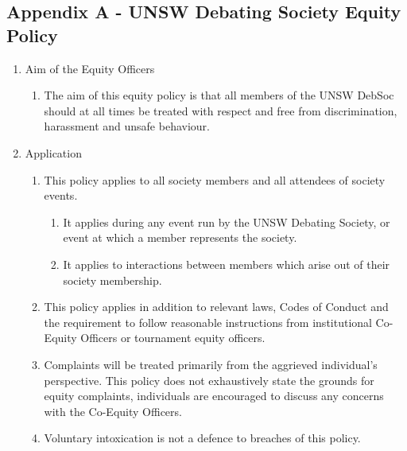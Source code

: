 \renewcommand\thesubsection{}
\subsection{Appendix A - UNSW Debating Society Equity Policy}
\renewcommand\thesubsection{\Alph{subsection}}

\begin{enumerate}
\item Aim of the Equity Officers
  \begin{enumerate}
  \item The aim of this equity policy is that all members of the UNSW DebSoc should at all times be treated with respect and free from discrimination, harassment and unsafe behaviour.
  \end{enumerate}

\item Application
  \begin{enumerate}
  \item This policy applies to all society members and all attendees of society events.
  \begin{enumerate}
    \item It applies during any event run by the UNSW Debating Society, or event at which a member represents the society.
    \item It applies to interactions between members which arise out of their society membership.
  \end{enumerate}
  \item This policy applies in addition to relevant laws, Codes of Conduct and the requirement to follow reasonable instructions from institutional Co-Equity Officers or tournament equity officers.
  \item Complaints will be treated primarily from the aggrieved individual’s perspective. This policy does not exhaustively state the grounds for equity complaints, individuals are encouraged to discuss any concerns with the Co-Equity Officers.
  \item Voluntary intoxication is not a defence to breaches of this policy.
  \end{enumerate}


\end{enumerate}
